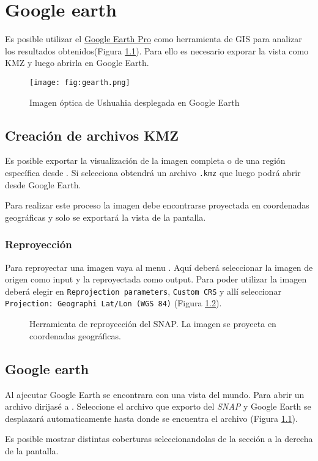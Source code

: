 \chapter{Google earth}\label{ap:GE}

Es posible utilizar el \href{https://www.google.com/earth/desktop/}{Google Earth Pro} como herramienta de GIS para analizar los resultados obtenidos(Figura \ref{fig:gearth}). Para ello es necesario exporar la vista como KMZ y luego abrirla en Google Earth.

\begin{figure}[h!]
    \centering
    \texttt{[image: fig:gearth.png]}
    \caption{Imagen óptica de Ushuahia desplegada en Google Earth}
    \label{fig:gearth}
\end{figure}

\section{Creación de archivos KMZ}

Es posible exportar la visualización de la imagen completa o de una región específica desde . Si selecciona  obtendrá un archivo \texttt{.kmz} que luego podrá abrir desde Google Earth.

Para realizar este proceso la imagen debe encontrarse proyectada en coordenadas geográficas y solo se exportará la vista de la pantalla.

\subsection{Reproyección}

Para reproyectar una imagen vaya al menu . Aquí deberá seleccionar la imagen de origen como input y la reproyectada como output. Para poder utilizar la imagen deberá elegir en \texttt{Reprojection parameters}, \texttt{Custom CRS} y allí seleccionar \texttt{Projection: Geographi Lat/Lon (WGS 84)} (Figura \ref{fig:reproj}).

\begin{figure}[h!]
    \centering
    \hspace{1cm}
    \caption{Herramienta de reproyección del SNAP. La imagen se proyecta en coordenadas geográficas.}
    \label{fig:reproj}
\end{figure}

\section{Google earth}

Al ajecutar Google Earth se encontrara con una vista del mundo. Para abrir un archivo  dirijasé a . Seleccione el archivo que exporto del \emph{SNAP} y Google Earth se desplazará automaticamente hasta donde se encuentra el archivo (Figura \ref{fig:gearth}).

Es posible mostrar distintas coberturas seleccionandolas de la sección  a la derecha de la pantalla.
